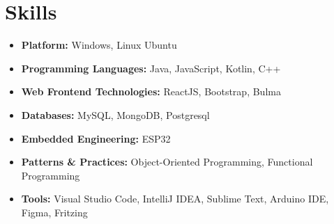 \documentclass[11pt,a4paper,sans]{moderncv}        %
\begin{document}
\makecvtitle 
\vspace{-10pt}
\section{Skills}

\vspace{1pt}

\begin{itemize}

\item \textbf{Platform:} Windows, Linux Ubuntu

\vspace{1pt}

\item \textbf{Programming Languages:} Java, JavaScript, Kotlin, C++

\vspace{1pt}

\item \textbf{Web Frontend Technologies:} ReactJS, Bootstrap, Bulma

\vspace{1pt}

\item \textbf{Databases:} MySQL, MongoDB, Postgresql

\vspace{1pt}

\item \textbf{Embedded Engineering:} ESP32

\vspace{1pt}

\item \textbf{Patterns \& Practices:} Object-Oriented Programming, Functional Programming

\vspace{1pt}

\item \textbf{Tools:} Visual Studio Code, IntelliJ IDEA, Sublime Text, Arduino IDE, Figma, Fritzing

\vspace{1pt}

\end{itemize}
\end{document}
